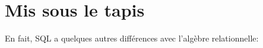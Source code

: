 %
%
%
%
%
%
\section{Mis sous le tapis}
En fait, SQL a quelques autres différences avec l'algèbre
relationnelle:

